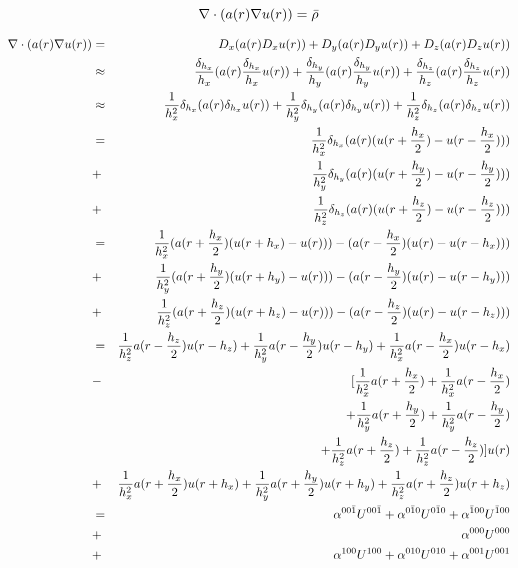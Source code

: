 \documentclass[11pt]{article}
\begin{document}
 \newcommand{\alc}{\alpha^{000}}
 \newcommand{\alxp}{\alpha^{100}}
 \newcommand{\alxm}{\alpha^{\bar{1}00}}
 \newcommand{\alyp}{\alpha^{010}}
 \newcommand{\alym}{\alpha^{0\bar{1}0}}
 \newcommand{\alzp}{\alpha^{001}}
 \newcommand{\alzm}{\alpha^{00\bar{1}}}

 \newcommand{\Uc}{U^{000}}
 \newcommand{\Uxp}{U^{100}}
 \newcommand{\Uxm}{U^{\bar{1}00}}
 \newcommand{\Uyp}{U^{010}}
 \newcommand{\Uym}{U^{0\bar{1}0}}
 \newcommand{\Uzp}{U^{001}}
 \newcommand{\Uzm}{U^{00\bar{1}}}

\begin{center}
\begin{minipage}{1.5in}
\end{minipage} \[ \nabla\cdot(a(r) \nabla u(r)) = \bar{\rho} \]
\end{center}


 \begin{eqnarray*}
 \nabla\cdot(\ac \nabla \uc) & = & D_x (\ac D_x \uc) + D_y (\ac D_y \uc) + D_z (\ac D_z \uc) \\
 & \approx & \frac{\delta_{h_x}}{h_x} (\ac \frac{\delta_{h_x}}{h_x} \uc) + 
             \frac{\delta_{h_y}}{h_y} (\ac \frac{\delta_{h_y}}{h_y} \uc) + 
             \frac{\delta_{h_z}}{h_z} (\ac \frac{\delta_{h_z}}{h_z} \uc) \\
 & \approx & \frac{1}{h_x^2}\delta_{h_x} (\ac \delta_{h_x} \uc) + 
             \frac{1}{h_y^2}\delta_{h_y} (\ac \delta_{h_y} \uc) + 
             \frac{1}{h_z^2}\delta_{h_z} (\ac \delta_{h_z} \uc) \\
 & = & \frac{1}{h_x^2}\delta_{h_x} (\ac (\uxph - \uxmh))\\
 & + & \frac{1}{h_y^2}\delta_{h_y} (\ac (\uyph - \uymh)) \\
 & + & \frac{1}{h_z^2}\delta_{h_z} (\ac (\uzph - \uzmh)) \\
 & = & \frac{1}{h_x^2} (\axph (\uxp - \uc)) - (\axmh (\uc - \uxm)) \\
 & + & \frac{1}{h_y^2} (\ayph (\uyp - \uc)) - (\aymh (\uc - \uym)) \\
 & + & \frac{1}{h_z^2} (\azph (\uzp - \uc)) - (\azmh (\uc - \uzm)) \\
 & = & \frac{1}{h_z^2} \azmh \uzm + \frac{1}{h_y^2} \aymh \uym + \frac{1}{h_x^2} \axmh \uxm \\
 & - & [\frac{1}{h_x^2} \axph  + \frac{1}{h_x^2} \axmh \\
 & &+  \frac{1}{h_y^2} \ayph  + \frac{1}{h_y^2} \aymh \\
 & & +  \frac{1}{h_z^2} \azph  + \frac{1}{h_z^2} \azmh] \uc \\
 & + &  \frac{1}{h_x^2} \axph \uxp + \frac{1}{h_y^2} \ayph \uyp  + \frac{1}{h_z^2} \azph \uzp \\
 & = & \alzm\Uzm +  \alym\Uym +  \alxm\Uxm \\
 & + & \alc\Uc \\
 & + & \alxp\Uxp +  \alyp\Uyp +  \alzp\Uzp 
 \end{eqnarray*}
\end{document}
